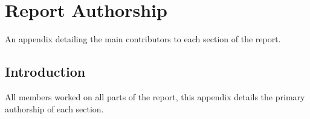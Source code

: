 \chapter{Report Authorship} \label{App:Report Authorship}

\begin{preamble}
	An appendix detailing the main contributors to each section of the report.
\end{preamble}

\section{Introduction}

All members worked on all parts of the report, this appendix details the primary authorship of each section.

